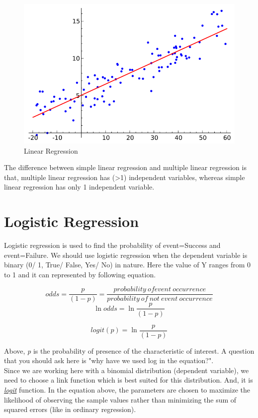 \documentclass[11pt, a4paper]{report}
\begin{document}
\begin{figure}[!bth]
	\center
	\includegraphics[scale=0.4]{images/Linear_regression}
	\caption[Linear Regression]{Linear Regression \cite{wiki:LinearRegression}}
	\label{fig:linearRegression}
\end{figure}

The difference between simple linear regression and multiple linear regression is that, multiple linear regression has (\textgreater1) independent variables, whereas simple linear regression has only 1 independent variable. \cite{desc:RegressionAnalysis} 


\section{Logistic Regression}

Logistic regression is used to find the probability of event=Success and event=Failure. We should use logistic regression when the dependent variable is binary (0/ 1, True/ False, Yes/ No) in nature. Here the value of Y ranges from 0 to 1 and it can represented by following equation.


\[ odds = \frac{p}{(1-p)} = \frac{probability \ of event \ occurrence}{probability \ of \ not \ event \ occurrence}
\]
\[ \ln{odds}  = \ln{\frac{p}{(1-p)}} \]


\[ logit (p) = \ln{\frac{p}{(1-p)}} \]

Above, \textit{p} is the probability of presence of the characteristic of interest. A question that you should ask here is "why have we used log in the equation?". \\

Since we are working here with a binomial distribution (dependent variable), we need to choose a link function which is best suited for this distribution. And, it is \href{https://en.wikipedia.org/wiki/Logistic_function}{\textit{logit}} 
function. In the equation above, the parameters are chosen to maximize the likelihood of observing the sample values rather than minimizing the sum of squared errors (like in ordinary regression). \cite{desc:RegressionAnalysis}
\end{document}
